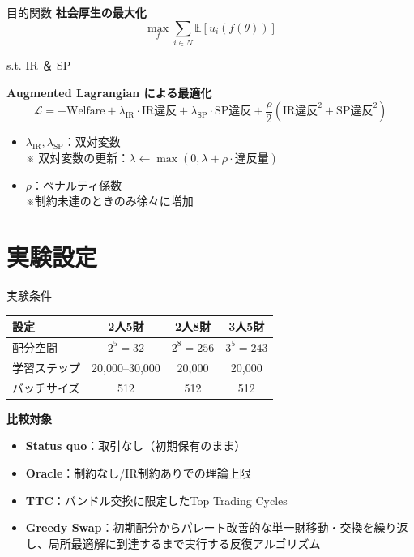 \documentclass[aspectratio=169,12pt]{beamer}
\begin{document}
\begin{frame}{目的関数}
\textbf{社会厚生の最大化}
\[
\max_{f} \sum_{i \in N} \mathbb{E}[u_i(f(\theta))]
\]
\begin{center}
s.t. IR ＆ SP
\end{center}

\vspace{0.5cm}
\textbf{Augmented Lagrangian による最適化}
\[
\mathcal{L} = -\text{Welfare} + \lambda_{\text{IR}} \cdot \text{IR違反} + \lambda_{\text{SP}} \cdot \text{SP違反} + \frac{\rho}{2}(\text{IR違反}^2+\text{SP違反}^2)
\]

\begin{itemize}
    \item $\lambda_{\text{IR}}, \lambda_{\text{SP}}$：双対変数
    \\{\footnotesize ※ 双対変数の更新：$\lambda \leftarrow \max(0, \lambda + \rho \cdot \text{違反量})$}
    \item $\rho$：ペナルティ係数
    \\{\footnotesize ※制約未達のときのみ徐々に増加}
\end{itemize}


\end{frame}

\section{実験設定}

\begin{frame}{実験条件}
\begin{table}[h]
\centering
\begin{tabular}{lccc}
\toprule
設定 & 2人5財 & 2人8財 & 3人5財 \\
\midrule
配分空間 & $2^5 = 32$ & $2^8 = 256$ & $3^5 = 243$ \\
学習ステップ & 20,000--30,000 & 20,000 & 20,000 \\
バッチサイズ & 512 & 512 & 512 \\
\bottomrule
\end{tabular}
\end{table}

\vspace{0.5cm}
\textbf{比較対象}
\begin{itemize}
    \item \textbf{Status quo}：取引なし（初期保有のまま）
    \item \textbf{Oracle}：制約なし/IR制約ありでの理論上限
    \item \textbf{TTC}：バンドル交換に限定したTop Trading Cycles
    \item \textbf{Greedy Swap}：初期配分からパレート改善的な単一財移動・交換を繰り返し、局所最適解に到達するまで実行する反復アルゴリズム
\end{itemize}
\end{frame}
\end{document}
